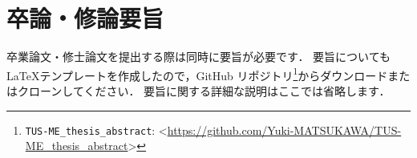 

\section{卒論・修論要旨}
\label{sec:abstract}

卒業論文・修士論文を提出する際は同時に要旨が必要です．
要旨についても \LaTeX テンプレートを作成したので，GitHub リポジトリ\footnote{\texttt{TUS-ME\_thesis\_abstract}: \textless\url{https://github.com/Yuki-MATSUKAWA/TUS-ME_thesis_abstract}\textgreater}からダウンロードまたはクローンしてください．
要旨に関する詳細な説明はここでは省略します．

